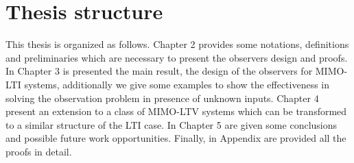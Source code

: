 \documentclass[11pt,letterpaper,twoside,openright]{report}
\begin{document}
\section{Thesis structure}
This thesis is organized as follows. Chapter 2 provides some notations, definitions and preliminaries which are necessary to present the observers design and proofs. In Chapter 3 is presented the main result, the design of the observers for MIMO-LTI systems, additionally we give some examples to show the effectiveness in solving the observation problem in presence of unknown inputs. Chapter 4 present an extension to a class of MIMO-LTV systems which can be transformed to a similar structure of the LTI case. In Chapter 5 are given some conclusions and possible future work opportunities. Finally, in Appendix are provided all the proofs in detail.









	
	 
	
\end{document}
